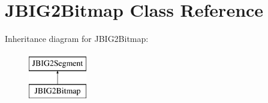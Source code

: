 \hypertarget{class_j_b_i_g2_bitmap}{}\section{J\+B\+I\+G2\+Bitmap Class Reference}
\label{class_j_b_i_g2_bitmap}
Inheritance diagram for J\+B\+I\+G2\+Bitmap\+:\begin{figure}[H]
\begin{center}
\leavevmode
\includegraphics[height=2.000000cm]{class_j_b_i_g2_bitmap}
\end{center}
\end{figure}
